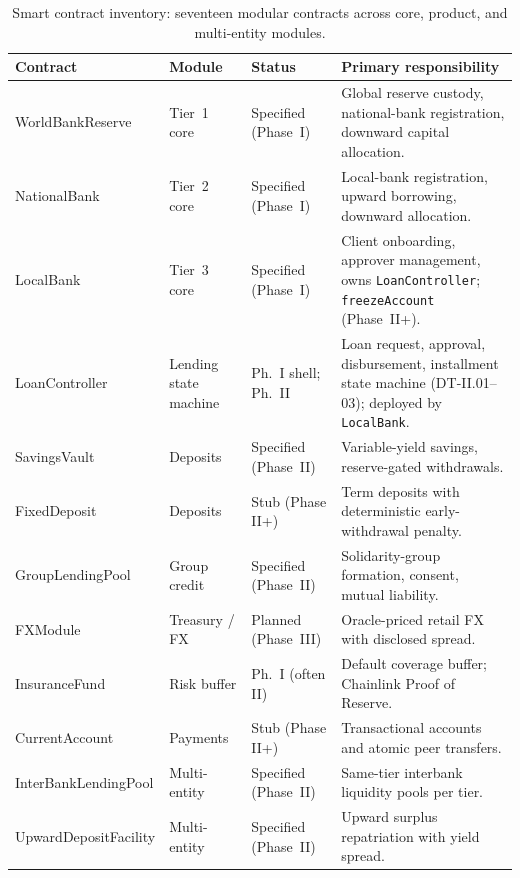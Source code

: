 \documentclass[12pt,a4paper]{report}
\newcommand{\tableheadcolor}{\rowcolor{TableHeadBg}}
\begin{document}
\begin{table}[H]
\centering
\caption[Smart contract inventory]{Smart contract inventory: seventeen modular contracts across core, product, and multi-entity modules.}
\label{tab:contract-inventory}
\footnotesize
\setlength{\tabcolsep}{3.5pt}
\renewcommand{\arraystretch}{1.12}
\begin{tabular}{@{}>{\raggedright\arraybackslash}p{2.75cm}>{\raggedright\arraybackslash}p{1.85cm}>{\raggedright\arraybackslash}p{1.65cm}>{\raggedright\arraybackslash}p{6.85cm}@{}}
\toprule
\tableheadcolor
\textbf{Contract} & \textbf{Module} & \textbf{Status} & \textbf{Primary responsibility} \\
\midrule
WorldBankReserve & Tier~1 core & Specified (Phase~I) & Global reserve custody, national-bank registration, downward capital allocation. \\
NationalBank & Tier~2 core & Specified (Phase~I) & Local-bank registration, upward borrowing, downward allocation. \\
LocalBank & Tier~3 core & Specified (Phase~I) & Client onboarding, approver management, owns \texttt{LoanController}; \texttt{freezeAccount} (Phase~II+). \\
LoanController & Lending state machine & Ph.~I shell; Ph.~II & Loan request, approval, disbursement, installment state machine (DT-II.01--03); deployed by \texttt{LocalBank}. \\
SavingsVault & Deposits & Specified (Phase~II) & Variable-yield savings, reserve-gated withdrawals. \\
FixedDeposit & Deposits & Stub (Phase II+) & Term deposits with deterministic early-withdrawal penalty. \\
GroupLendingPool & Group credit & Specified (Phase~II) & Solidarity-group formation, consent, mutual liability. \\
FXModule & Treasury / FX & Planned (Phase~III) & Oracle-priced retail FX with disclosed spread. \\
InsuranceFund & Risk buffer & Ph.~I (often II) & Default coverage buffer; Chainlink Proof of Reserve. \\
CurrentAccount & Payments & Stub (Phase II+) & Transactional accounts and atomic peer transfers. \\
Inter\-Bank\-Lending\-Pool & Multi-entity & Specified (Phase~II) & Same-tier interbank liquidity pools per tier. \\
Upward\-Deposit\-Facility & Multi-entity & Specified (Phase~II) & Upward surplus repatriation with yield spread. \\

\end{tabular}
\end{table}
\end{document}
